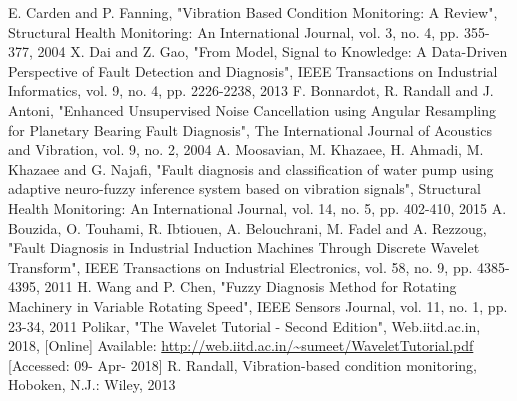 \documentclass[conference]{IEEEtran}
\begin{document}

%
%
%
\begin{thebibliography}{1}

E. Carden and P. Fanning, "Vibration Based Condition Monitoring: A Review", Structural Health Monitoring: An International Journal, vol. 3, no. 4, pp. 355-377, 2004
X. Dai and Z. Gao, "From Model, Signal to Knowledge: A Data-Driven Perspective of Fault Detection and Diagnosis", IEEE Transactions on Industrial Informatics, vol. 9, no. 4, pp. 2226-2238, 2013
F. Bonnardot, R. Randall and J. Antoni, "Enhanced Unsupervised Noise Cancellation using Angular Resampling for Planetary Bearing Fault Diagnosis", The International Journal of Acoustics and Vibration, vol. 9, no. 2, 2004
A. Moosavian, M. Khazaee, H. Ahmadi, M. Khazaee and G. Najafi, "Fault diagnosis and classification of water pump using adaptive neuro-fuzzy inference system based on vibration signals", Structural Health Monitoring: An International Journal, vol. 14, no. 5, pp. 402-410, 2015
A. Bouzida, O. Touhami, R. Ibtiouen, A. Belouchrani, M. Fadel and A. Rezzoug, "Fault Diagnosis in Industrial Induction Machines Through Discrete Wavelet Transform", IEEE Transactions on Industrial Electronics, vol. 58, no. 9, pp. 4385-4395, 2011
H. Wang and P. Chen, "Fuzzy Diagnosis Method for Rotating Machinery in Variable Rotating Speed", IEEE Sensors Journal, vol. 11, no. 1, pp. 23-34, 2011
Polikar, "The Wavelet Tutorial - Second Edition", Web.iitd.ac.in, 2018, [Online] Available: \url{http://web.iitd.ac.in/~sumeet/WaveletTutorial.pdf} [Accessed: 09- Apr- 2018]
R. Randall, Vibration-based condition monitoring, Hoboken, N.J.: Wiley, 2013

\end{thebibliography}




\end{document}
